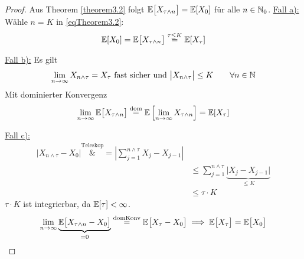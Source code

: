 \begin{proof}
Aus Theorem \ref{theorem3.2} folgt $\mathbb{E}\big[X_{\tau\wedge n}\big]=\mathbb{E}[X_0]$ für alle $n\in\mathbb{N}_0$.\nl
\underline{Fall a):}\\
Wähle $n=K$ in \eqref{eqTheorem3.2}:
\begin{align*}
\mathbb{E}[X_0]=\mathbb{E}\big[X_{\tau\wedge n}\big]\stackrel{\tau\leq K}{=}\mathbb{E}[X_\tau]
\end{align*}

\underline{Fall b):} Es gilt
\begin{align*}
\lim\limits_{n\to\infty} X_{n\wedge\tau}=X_\tau\text{ fast sicher und }\big| X_{n\wedge\tau}\big|\leq K\qquad\forall n\in\mathbb{N}
\end{align*}
Mit dominierter Konvergenz
\begin{align*}
\lim\limits_{n\to\infty}\mathbb{E}\big[X_{\tau\wedge n}\big]\stackrel{\text{dom}}{=}\mathbb{E}\left[\lim\limits_{n\to\infty} X_{\tau\wedge n}\right]=\mathbb{E}[X_\tau]
\end{align*}

\underline{Fall c):}
\begin{align*}
\big| X_{n\wedge\tau}-X_0\big|
\overset{\text{Teleskop}}&=
\left|\sum\limits_{j=1}^{n\wedge\tau} X_j-X_{j-1}\right|\\
&\leq\sum\limits_{j=1}^{n\wedge\tau} \underbrace{\big|X_j-X_{j-1}\big|}_{\leq K}\\
&\leq\tau\cdot K
\end{align*}
$\tau\cdot K$ ist integrierbar, da $\mathbb{E}[\tau]<\infty$.
\begin{align*}
\lim\limits_{n\to\infty}\underbrace{\mathbb{E}\big[X_{\tau\wedge n}-X_0\big]}_{=0}\stackrel{\text{domKonv}}{=}\mathbb{E}\big[X_\tau-X_0\big]
\implies
\mathbb{E}\big[X_\tau\big]=\mathbb{E}\big[X_0\big]
\end{align*}
\end{proof}

